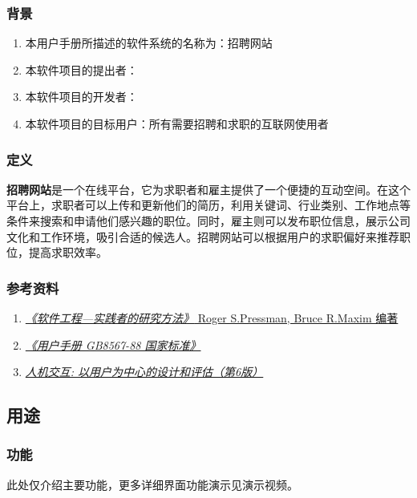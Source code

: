\documentclass[UTF8,a4paper,10pt]{ctexart}
\begin{document}
\subsubsection{背景}
\begin{enumerate}
    \item 本用户手册所描述的软件系统的名称为：招聘网站 
    \item 本软件项目的提出者：  
    \item 本软件项目的开发者：  
    \item 本软件项目的目标用户：所有需要招聘和求职的互联网使用者 
\end{enumerate}

\subsubsection{定义}
\textbf{招聘网站}是一个在线平台，它为求职者和雇主提供了一个便捷的互动空间。在这个平台上，求职者可以上传和更新他们的简历，利用关键词、行业类别、工作地点等条件来搜索和申请他们感兴趣的职位。同时，雇主则可以发布职位信息，展示公司文化和工作环境，吸引合适的候选人。招聘网站可以根据用户的求职偏好来推荐职位，提高求职效率。

\subsubsection{参考资料}
\begin{enumerate}
    \item  \href{http://images.china-pub.com/ebook40001-45000/41206/ch01.pdf}{\textit{《软件工程—实践者的研究方法》} Roger S.Pressman, Bruce R.Maxim 编著}
    \item \href{https://www.antpedia.com/standard/74250-1.html}{\textit{《用户手册 GB8567-88 国家标准》}}
    \item \href{http://www.tup.tsinghua.edu.cn/booksCenter/book_08468901.html}{\textit{人机交互: 以用户为中心的设计和评估（第6版）}}
\end{enumerate}

\subsection{用途}

\subsubsection{功能}

此处仅介绍主要功能，更多详细界面功能演示见演示视频。
\end{document}
